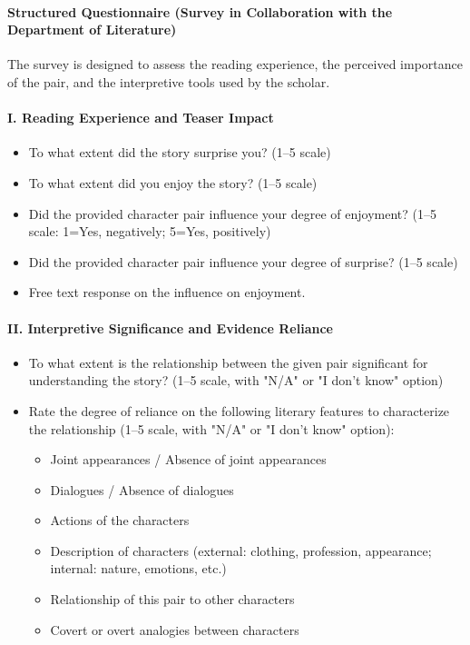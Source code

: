 \documentclass[a4paper,12pt]{report}
\begin{document}
\paragraph{Structured Questionnaire (Survey in Collaboration with the Department of Literature)}
The survey is designed to assess the reading experience, the perceived importance of the pair, and the interpretive tools used by the scholar.

\paragraph{I. Reading Experience and Teaser Impact}
\begin{itemize}
    \item To what extent did the story surprise you? (1--5 scale)
    \item To what extent did you enjoy the story? (1--5 scale)
    \item Did the provided character pair influence your degree of enjoyment? (1--5 scale: 1=Yes, negatively; 5=Yes, positively)
    \item Did the provided character pair influence your degree of surprise? (1--5 scale)
    \item Free text response on the influence on enjoyment.
\end{itemize}

\paragraph{II. Interpretive Significance and Evidence Reliance}
\begin{itemize}
    \item To what extent is the relationship between the given pair significant for understanding the story? (1--5 scale, with "N/A" or "I don't know" option)
    \item Rate the degree of reliance on the following literary features to characterize the relationship (1--5 scale, with "N/A" or "I don't know" option):
    \begin{itemize}
        \item Joint appearances / Absence of joint appearances
        \item Dialogues / Absence of dialogues
        \item Actions of the characters
        \item Description of characters (external: clothing, profession, appearance; internal: nature, emotions, etc.)
        \item Relationship of this pair to other characters
        \item Covert or overt analogies between characters
    \end{itemize}
\end{itemize}
\end{document}
